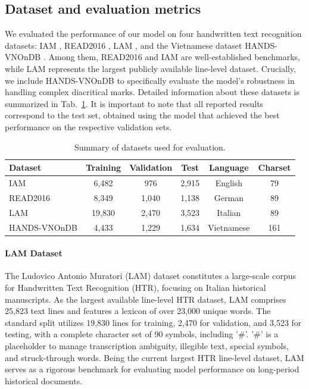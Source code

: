 \documentclass[final,5p,times]{elsarticle}
\begin{document}
\subsection{Dataset and evaluation metrics}

We evaluated the performance of our model on four handwritten text recognition datasets: IAM \cite{marti2002iam}, READ2016 \cite{sanchez2016read}, LAM \cite{cascianelli2022lam}, and the Vietnamese dataset HANDS-VNOnDB \cite{nguyen2018hands}. Among them, READ2016 and IAM are well-established benchmarks, while LAM represents the largest publicly available line-level dataset. Crucially, we include HANDS-VNOnDB to specifically evaluate the model's robustness in handling complex diacritical marks. Detailed information about these datasets is summarized in Tab.~\ref{table:datasets}. It is important to note that all reported results correspond to the test set, obtained using the model that achieved the best performance on the respective validation sets.

\begin{table}[!t]
    \centering
    \caption{Summary of datasets used for evaluation.}
    \label{table:datasets}
    \begin{tabular}{l|c|c|c|c|c}
        \hline
        Dataset & Training & Validation & Test & Language & Charset \\
        \hline
        \hline
        IAM & 6,482 & 976 & 2,915 & English & 79 \\
        READ2016 & 8,349 & 1,040 & 1,138 & German & 89 \\
        LAM & 19,830 & 2,470 & 3,523 & Italian & 89 \\
        HANDS-VNOnDB & 4,433 & 1,229 & 1,634 & Vietnamese & 161 \\
        \hline
        \hline
    \end{tabular}
\end{table}

\paragraph{LAM Dataset}
The Ludovico Antonio Muratori (LAM) dataset constitutes a large-scale corpus for Handwritten Text Recognition (HTR), focusing on Italian historical manuscripts. As the largest available line-level HTR dataset, LAM comprises 25,823 text lines and features a lexicon of over 23,000 unique words. The standard split utilizes 19,830 lines for training, 2,470 for validation, and 3,523 for testing, with a complete character set of 90 symbols, including '\#'. '\#' is a placeholder to manage transcription ambiguity, illegible text, special symbols, and struck-through words. Being the current largest HTR line-level dataset, LAM serves as a rigorous benchmark for evaluating model performance on long-period historical documents.
\end{document}

